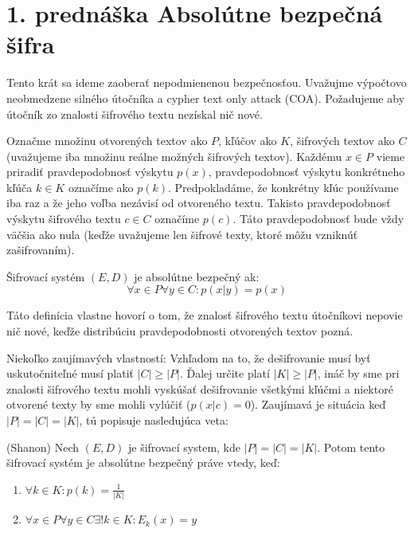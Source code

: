 \section{1. prednáška Absolútne bezpečná šifra}

Tento krát sa ideme zaoberať nepodmienenou bezpečnosťou. Uvažujme 
výpočtovo neobmedzene silného útočníka a cypher text only attack (COA).
Požadujeme aby útočník zo znalosti šifrového textu nezískal nič nové.

Označme množinu otvorených textov ako $P$, kľúčov ako $K$, šifrových textov ako $C$
(uvažujeme iba množinu reálne možných šifrových textov). Každému $x \in P$ vieme priradiť
pravdepodobnosť výskytu $p(x)$, pravdepodobnosť
výskytu konkrétneho kľúča $k \in K$ označíme ako $p(k)$. Predpokladáme, že
konkrétny kľúc používame iba raz a že jeho voľba nezávisí od otvoreného textu.
Takisto pravdepodobnosť výskytu šifrového textu $c \in C$ označíme $p(c)$. Táto pravdepodobnosť
bude vždy väčšia ako nula (keďže uvažujeme len šifrové texty, ktoré môžu vzniknúť zašifrovaním).

\begin{definicia}
Šifrovací systém $(E,D)$ je absolútne bezpečný ak:
$$\forall x \in P \forall y \in C\colon p(x | y) = p(x)$$
\end{definicia}
\begin{komentar}
Táto definícia vlastne hovorí o tom, že znalosť šifrového textu útočníkovi nepovie nič
nové, keďže distribúciu pravdepodobnosti otvorených textov pozná.
\end{komentar}

Niekoľko zaujímavých vlastností:
Vzhľadom na to, že dešifrovanie musí byť uskutočniteľné musí platiť $|C| \geq |P|$.
Ďalej určite platí $|K| \geq |P|$, ináč by sme pri znalosti šifrového textu mohli 
vyskúšať dešifrovanie všetkými kľúčmi a niektoré otvorené texty by sme mohli vylúčiť
($p(x|c) = 0$). Zaujímavá je situácia keď $|P| = |C| = |K|$, tú popisuje nasledujúca veta:

\begin{veta}{(Shanon)}
Nech $(E,D)$ je šifrovací system, kde $|P|=|C|=|K|$. Potom tento šifrovací systém je
absolútne bezpečný práve vtedy, keď:
\begin{enumerate}
\item $\forall k \in K\colon p(k) = \frac{1}{|K|}$
\item $\forall x \in P \forall y \in C \exists! k \in K\colon E_k(x) = y$
\end{enumerate}
\end{veta}

